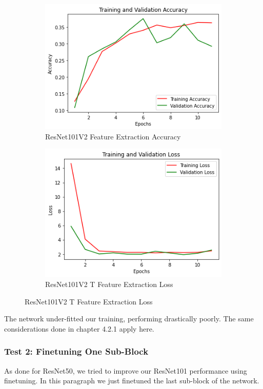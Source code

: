 \begin{figure}[H]
	\begin{subfigure}{0.5\textwidth}
		\includegraphics[width=0.9\linewidth]{img/resnet101v2/resnet101feacc.png} 
		\caption{ResNet101V2 Feature Extraction Accuracy}
		\label{fig:resnet101feacc}
	\end{subfigure}
	\begin{subfigure}{0.5\textwidth}
		\includegraphics[width=0.9\linewidth]{img/resnet101v2/resnet101feloss.png}
		\caption{ResNet101V2 T Feature Extraction Loss}
		\label{fig:resnet101feloss}
	\end{subfigure}
\end{figure}

The network under-fitted our training, performing drastically poorly. The same considerations done in chapter 4.2.1 apply here.


\subsubsection{Test 2: Finetuning One Sub-Block}
As done for ResNet50, we tried to improve our ResNet101 performance using finetuning. In this paragraph we just finetuned the last sub-block of the network.

